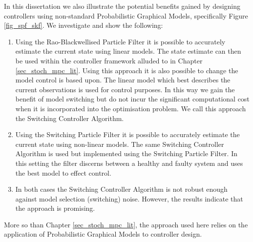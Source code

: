 In this dissertation we also illustrate the potential benefits gained by designing controllers using non-standard Probabilistic Graphical Models, specifically Figure \ref{fig_spf_skf}. We investigate and show the following:
\begin{enumerate}
\item
Using the Rao-Blackwellised Particle Filter it is possible to accurately estimate the current state using linear models. The state estimate can then be used within the controller framework alluded to in Chapter \ref{sec_stoch_mpc_lit}. Using this approach it is also possible to change the model control is based upon. The linear model which best describes the current observations is used for control purposes. In this way we gain the benefit of model switching but do not incur the significant computational cost when it is incorporated into the optimisation problem. We call this approach the Switching Controller Algorithm.
\item
Using the Switching Particle Filter it is possible to accurately estimate the current state using non-linear models. The same Switching Controller Algorithm is used but implemented using the Switching Particle Filter. In this setting the filter discerns between a healthy and faulty system and uses the best model to effect control.
\item
In both cases the Switching Controller Algorithm is not robust enough against model selection (switching) noise. However, the results indicate that the approach is promising.
\end{enumerate}
More so than Chapter \ref{sec_stoch_mpc_lit}, the approach used here relies on the application of Probabilistic Graphical Models to controller design.  



